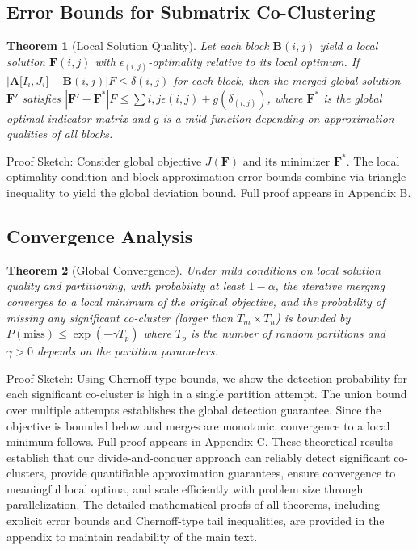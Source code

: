 \documentclass[journal]{IEEEtran}
\newtheorem{theorem}{Theorem}
\begin{document}
\subsection{Error Bounds for Submatrix Co-Clustering}
\begin{theorem}[Local Solution Quality]
    Let each block $\mathbf{B}{(i,j)}$ yield a local solution $\mathbf{F}{(i,j)}$ with $\epsilon_{(i,j)}$-optimality relative to its local optimum. If $|\mathbf{A}\lbrack I_i,J_i\rbrack - \mathbf{B}{(i,j)}|F \le \delta{(i,j)}$ for each block, then the merged global solution $\mathbf{F}'$ satisfies $|\mathbf{F}' - \mathbf{F}^*|F \le \sum{i,j} \epsilon{(i,j)} + g({\delta_{(i,j)}})$, where $\mathbf{F}^*$ is the global optimal indicator matrix and $g$ is a mild function depending on approximation qualities of all blocks.
\end{theorem}
Proof Sketch: Consider global objective $J(\mathbf{F})$ and its minimizer $\mathbf{F}^*$. The local optimality condition and block approximation error bounds combine via triangle inequality to yield the global deviation bound. Full proof appears in Appendix B.
\subsection{Convergence Analysis}
\begin{theorem}[Global Convergence]
    Under mild conditions on local solution quality and partitioning, with probability at least $1-\alpha$, the iterative merging converges to a local minimum of the original objective, and the probability of missing any significant co-cluster (larger than $T_m \times T_n$) is bounded by $P(\text{miss}) \le \exp(-\gamma T_p)$ where $T_p$ is the number of random partitions and $\gamma > 0$ depends on the partition parameters.
\end{theorem}
Proof Sketch: Using Chernoff-type bounds, we show the detection probability for each significant co-cluster is high in a single partition attempt. The union bound over multiple attempts establishes the global detection guarantee. Since the objective is bounded below and merges are monotonic, convergence to a local minimum follows. Full proof appears in Appendix C.
These theoretical results establish that our divide-and-conquer approach can reliably detect significant co-clusters, provide quantifiable approximation guarantees, ensure convergence to meaningful local optima, and scale efficiently with problem size through parallelization. The detailed mathematical proofs of all theorems, including explicit error bounds and Chernoff-type tail inequalities, are provided in the appendix to maintain readability of the main text.
\end{document}
